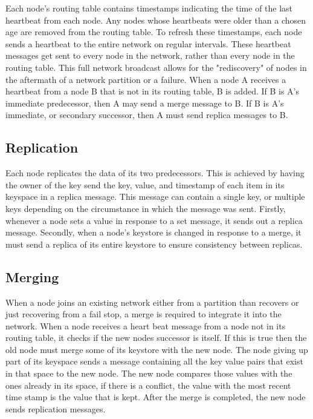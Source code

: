 \documentclass[11pt]{article}
\begin{document}
Each node's routing table contains timestamps indicating the time of the last heartbeat from each node. Any nodes whose heartbeats were older than a chosen age are removed from the routing table. To refresh these timestamps, each node sends a heartbeat to the entire network on regular intervals. These heartbeat messages get sent to every node in the network, rather than every node in the routing table. This full network broadcast allows for the "rediscovery" of nodes in the aftermath of a network partition or a failure. When a node A receives a heartbeat from a node B that is not in its routing table, B is added. If B is A's immediate predecessor, then A may send a merge message to B. If B is A's immediate, or secondary successor, then A must send replica messages to B.

\subsection{Replication}\label{sec:Rep}

Each node replicates the data of its two predecessors. This is achieved by having the owner of the key send the key, value, and timestamp of each item in its keyspace in a replica message. This message can contain a single key, or multiple keys depending on the circumstance in which the message was sent. Firstly, whenever a node sets a value in response to a set message, it sends out a replica message. Secondly, when a node's keystore is changed in response to a merge, it must send a replica of its entire keystore to ensure consistency between replicas.

\subsection{Merging}\label{sec:Merg}

When a node joins an existing network either from a partition than recovers or just recovering from a fail stop, a merge is required to integrate it into the network. When a node receives a heart beat message from a node not in its routing table, it checks if the new nodes successor is itself. If this is true then the old node must merge some of its keystore with the new node. The node giving up part of its keyspace sends a message containing all the key value pairs that exist in that space to the new node. The new node compares those values with the ones already in its space, if there is a conflict, the value with the most recent time stamp is the value that is kept. After the merge is completed, the new node sends replication messages.
\end{document}
